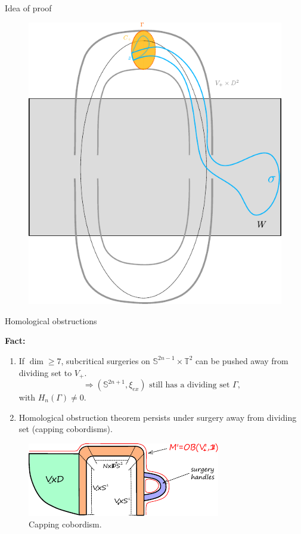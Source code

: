 \documentclass{beamer}
\begin{document}
\begin{frame}{Idea of proof}
    \begin{figure}
        \centering
        \includegraphics[trim=0cm 2.5cm 0cm 0cm, clip]{../images/obstruction_proof_sketch.pdf}
    \end{figure}
    \end{frame}

\begin{frame}{Homological obstructions}

\textbf{Fact:} 

\begin{enumerate}
    \item If $\dim \geq 7$, subcritical surgeries on $\mathbb S^{2n-1}\times \mathbb T^2$ can be pushed away from dividing set to $V_+$.
$$
\Rightarrow (\mathbb S^{2n+1},\xi_{ex}) \mbox{ still has a dividing set } \Gamma,
$$
with $H_n(\Gamma)\neq 0$.

\pause 
\item Homological obstruction theorem persists under surgery away from dividing set (capping cobordisms).
\end{enumerate}


\begin{figure}
    \centering
    \includegraphics[width=0.7\linewidth]{blowdown_handle.pdf}
    \caption{Capping cobordism.}
    \label{fig:capping_cobordism}
\end{figure}

\end{frame}
\end{document}
